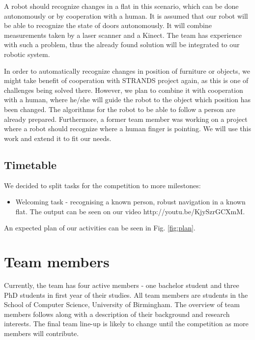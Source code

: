 \documentclass[conference]{IEEEtran}
\begin{document}
A robot should recognize changes in a flat in this scenario, which can be done autonomously or by cooperation with a human. It is assumed that our robot will be able to recognize the state of doors autonomously. It will combine measurements taken by a laser scanner and a Kinect. The team has experience with such a problem, thus the already found solution will be integrated to our robotic system. 

In order to automatically recognize changes in position of furniture or objects, we might take benefit of cooperation with STRANDS project again, as this is one of challenges being solved there. However, we plan to combine it with cooperation with a human, where he/she will guide the robot to the object which position has been changed. The algorithms for the robot to be able to follow a person are already prepared. Furthermore, a former team member was working on a project where a robot should recognize where a human finger is pointing. We will use this work and extend it to fit our needs.

\subsection{Timetable}
We decided to split tasks for the competition to more milestones:
\begin{itemize}
\item Welcoming task - recognising a known person, robust navigation in a known flat. The output can be seen on our video \textsf{http://youtu.be/KjySzrGCXmM}.
\end{itemize}
An expected plan of our activities can be seen in Fig. \ref{fig:plan}.


\section{Team members}
Currently, the team has four active members - one bachelor student and three PhD students in first year of their studies. All team members are students in the School of Computer Science, University of Birmingham. The overview of team members follows along with a description of their background and research interests. The final team line-up is likely to change until the competition as more members will contribute.
\end{document}

